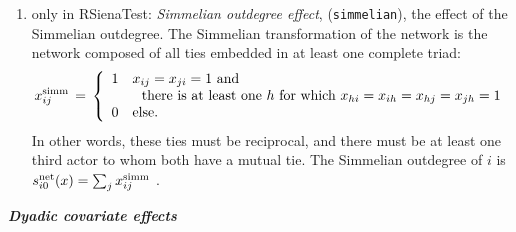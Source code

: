 \documentclass[a4paper,fleqn,11pt]{article}
\newcommand{\+}{\, + \,}
\newcommand{\vit}{\theenumi}
\newcounter{savenumi}
\begin{document}
\begin{enumerate}
\setcounter{enumi}{\value{savenumi}}
\item only in \textsf{RSienaTest}: \emph{Simmelian outdegree effect}, (\texttt{simmelian}), the effect of
      the Simmelian outdegree. The Simmelian transformation of the network is
      the network composed of all ties embedded in at least one complete triad:
\[
    x^{\rm{simm}}_{ij} \,=\, \left\{ \begin{array}{cl}
                               1 & x_{ij} = x_{ji} = 1 \text{ and} \\
                                  & \ \text{ there is at least one }
                                      h \text{ for which } x_{hi} = x_{ih} = x_{hj} = x_{jh} = 1 \\
                               0 & \text{else.}
                             \end{array} \right.
\]
      In other words, these ties must be reciprocal, and there must be at least one
      third actor to whom both have a mutual tie.
      The Simmelian outdegree of $i$ is  \\
$s^{\rm net}_{i\vit}(x ) = \sum_j  x^{\rm{simm}}_{ij} $ .\\

\setcounter{savenumi}{\value{enumi}}
\end{enumerate}
\medskip

\noindent
\textbf{\emph{Dyadic covariate effects}}
\medskip
\end{document}

